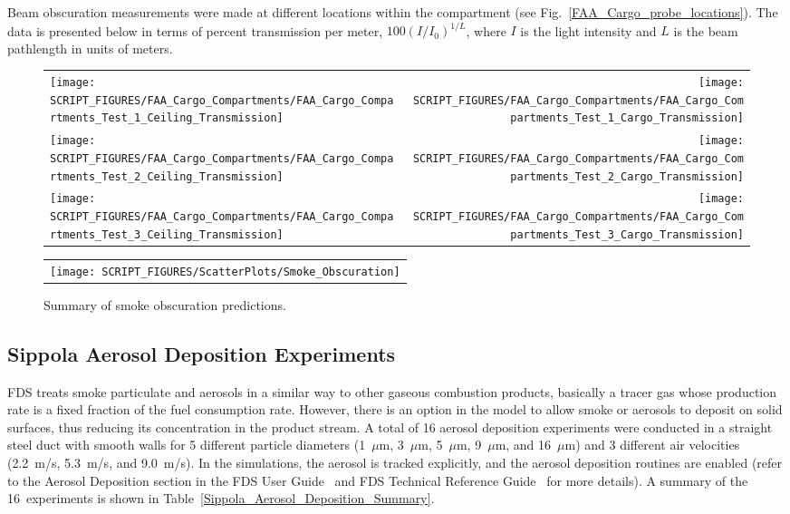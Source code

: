 Beam obscuration measurements were made at different locations within the compartment (see Fig.~\ref{FAA_Cargo_probe_locations}). The data is presented below in terms of percent transmission per meter, $100(I/I_0)^{1/L}$, where $I$ is the light intensity and $L$ is the beam pathlength in units of meters.

\begin{figure}[h!]
\begin{tabular*}{\textwidth}{l@{\extracolsep{\fill}}r}
\texttt{[image: SCRIPT\_FIGURES/FAA\_Cargo\_Compartments/FAA\_Cargo\_Compartments\_Test\_1\_Ceiling\_Transmission]} &
\texttt{[image: SCRIPT\_FIGURES/FAA\_Cargo\_Compartments/FAA\_Cargo\_Compartments\_Test\_1\_Cargo\_Transmission]} \\
\texttt{[image: SCRIPT\_FIGURES/FAA\_Cargo\_Compartments/FAA\_Cargo\_Compartments\_Test\_2\_Ceiling\_Transmission]} &
\texttt{[image: SCRIPT\_FIGURES/FAA\_Cargo\_Compartments/FAA\_Cargo\_Compartments\_Test\_2\_Cargo\_Transmission]} \\
\texttt{[image: SCRIPT\_FIGURES/FAA\_Cargo\_Compartments/FAA\_Cargo\_Compartments\_Test\_3\_Ceiling\_Transmission]} &
\texttt{[image: SCRIPT\_FIGURES/FAA\_Cargo\_Compartments/FAA\_Cargo\_Compartments\_Test\_3\_Cargo\_Transmission]}
\end{tabular*}
\end{figure}

\newpage

\begin{figure}[p]
\begin{center}
\begin{tabular}{c}
\texttt{[image: SCRIPT\_FIGURES/ScatterPlots/Smoke\_Obscuration]}
\end{tabular}
\end{center}
\caption[Summary of smoke obscuration predictions]{Summary of smoke obscuration predictions.}
\end{figure}


\clearpage

\subsection{Sippola Aerosol Deposition Experiments}

FDS treats smoke particulate and aerosols in a similar way to other gaseous combustion products, basically a tracer gas whose production rate is a fixed fraction of the fuel consumption rate. However, there is an option in the model to allow smoke or aerosols to deposit on solid surfaces, thus reducing its concentration in the product stream. A total of 16 aerosol deposition experiments were conducted in a straight steel duct with smooth walls for 5 different particle diameters (1~$\mu$m, 3~$\mu$m, 5~$\mu$m, 9~$\mu$m, and 16~$\mu$m) and 3 different air velocities (2.2~m/s, 5.3~m/s, and 9.0~m/s). In the simulations, the aerosol is tracked explicitly, and the aerosol deposition routines are enabled (refer to the Aerosol Deposition section in the FDS User Guide~\cite{FDS_Users_Guide} and FDS Technical Reference Guide~\cite{FDS_Math_Guide} for more details). A summary of the 16~experiments is shown in Table~\ref{Sippola_Aerosol_Deposition_Summary}.

